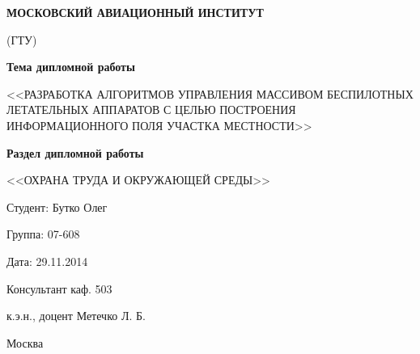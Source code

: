 \begin{titlepage}
\newpage

\begin{center}

    \textbf{МОСКОВСКИЙ АВИАЦИОННЫЙ ИНСТИТУТ}

    (ГТУ)

\end{center}

\vspace{\fill}

\begin{center}

    \textbf{Тема дипломной работы}

    <<РАЗРАБОТКА АЛГОРИТМОВ УПРАВЛЕНИЯ МАССИВОМ БЕСПИЛОТНЫХ
    ЛЕТАТЕЛЬНЫХ АППАРАТОВ С ЦЕЛЬЮ ПОСТРОЕНИЯ ИНФОРМАЦИОННОГО
    ПОЛЯ УЧАСТКА МЕСТНОСТИ>>

    \vspace{0.5em}

    \textbf{Раздел дипломной работы}

    <<ОХРАНА ТРУДА И ОКРУЖАЮЩЕЙ СРЕДЫ>>

\end{center}

\vspace{\fill}

\begin{flushright}
    Студент: Бутко Олег

    Группа: 07-608

    Дата: 29.11.2014

    Консультант каф. 503

    к.э.н., доцент Метечко Л. Б.

\end{flushright}

\vspace{\fill}

\begin{center}
    Москва
\end{center}

\end{titlepage}

